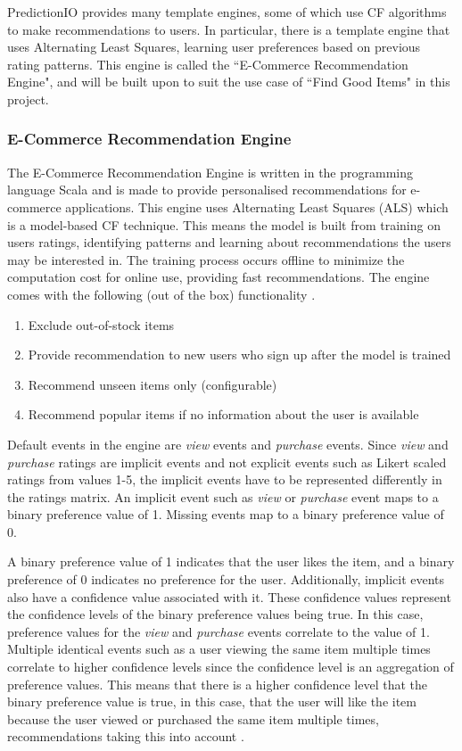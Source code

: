 PredictionIO \cite{predictionio} provides many template engines, some of which use CF algorithms to make recommendations to users. In particular, there is a template engine that uses Alternating Least Squares, learning user preferences based on previous rating patterns. This engine is called the ``E-Commerce Recommendation Engine", and will be built upon to suit the use case of ``Find Good Items" in this project. 

\subsubsection{E-Commerce Recommendation Engine}

The E-Commerce Recommendation Engine is written in the programming language Scala and is made to provide personalised recommendations for e-commerce applications. This engine uses Alternating Least Squares (ALS) which is a model-based CF technique. This means the model is built from training on users ratings, identifying patterns and learning about recommendations the users may be interested in. The training process occurs offline to minimize the computation cost for online use, providing fast recommendations. The engine comes with the following (out of the box) functionality \cite{predictionio}.
\begin{enumerate}
 \item Exclude out-of-stock items
 \item Provide recommendation to new users who sign up after the model is trained
 \item Recommend unseen items only (configurable)
 \item Recommend popular items if no information about the user is available
\end{enumerate}

Default events in the engine are \textit{view} events and \textit{purchase} events.
Since \textit{view} and \textit{purchase} ratings are implicit events and not explicit events such as Likert scaled ratings from values 1-5, the implicit events have to be represented differently in the ratings matrix. An implicit event such as \textit{view} or \textit{purchase} event maps to a binary preference value of 1. Missing events map to a binary preference value of 0. 

A binary preference value of 1 indicates that the user likes the item, and a binary preference of 0 indicates no preference for the user. Additionally, implicit events also have a confidence value associated with it. These confidence values represent the confidence levels of the binary preference values being true. In this case, preference values for the \textit{view} and \textit{purchase} events correlate to the value of 1. Multiple identical events such as a user viewing the same item multiple times correlate to higher confidence levels since the confidence level is an aggregation of preference values. This means that there is a higher confidence level that the binary preference value is true, in this case, that the user will like the item because the user viewed or purchased the same item multiple times, recommendations taking this into account . 

